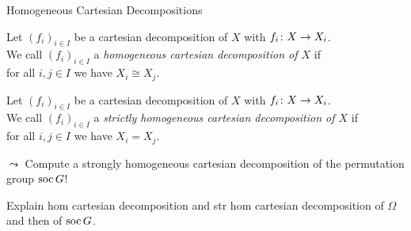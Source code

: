 
\begin{frame}{Homogeneous Cartesian Decompositions}
    \begin{defn}
        Let $(f_i)_{i \in I}$ be a cartesian decomposition of $X$
        with $f_i \colon X \rightarrow X_i$.
        \\
        We call $(f_i)_{i \in I}$ a
        \emph{homogeneous cartesian decomposition of $X$}
        if
        \\
        \pause
        for all $i,j \in I$ we have $X_i \cong X_j$.
    \end{defn}
    \pause

    \begin{defn}
        Let $(f_i)_{i \in I}$ be a cartesian decomposition of $X$
        with $f_i \colon X \rightarrow X_i$.
        \\
        We call $(f_i)_{i \in I}$ a
        \emph{strictly homogeneous cartesian decomposition of $X$}
        if
        \\
        \pause
        for all $i,j \in I$ we have $X_i = X_j$.
    \end{defn}
    \pause

    $\leadsto$
    Compute a strongly homogeneous cartesian decomposition of the permutation
    group $\operatorname{soc} G$!
\end{frame}

\note
{
Explain hom cartesian decomposition and str hom cartesian decomposition of
$\Omega$ and then of $\operatorname{soc} G$.
}
